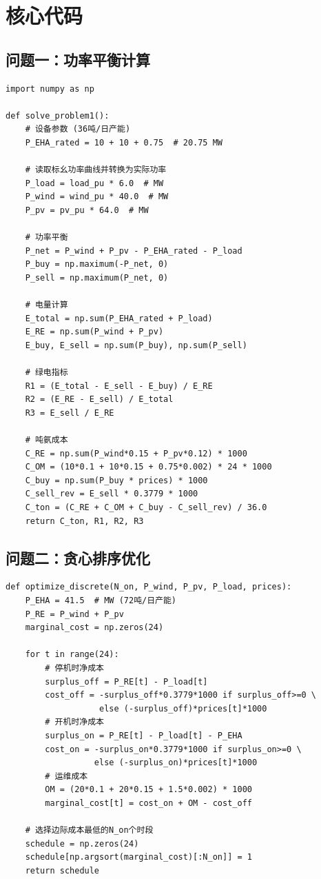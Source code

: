 \section{核心代码}

\subsection{问题一：功率平衡计算}

\begin{verbatim}
import numpy as np

def solve_problem1():
    # 设备参数 (36吨/日产能)
    P_EHA_rated = 10 + 10 + 0.75  # 20.75 MW
    
    # 读取标幺功率曲线并转换为实际功率
    P_load = load_pu * 6.0  # MW
    P_wind = wind_pu * 40.0  # MW
    P_pv = pv_pu * 64.0  # MW
    
    # 功率平衡
    P_net = P_wind + P_pv - P_EHA_rated - P_load
    P_buy = np.maximum(-P_net, 0)
    P_sell = np.maximum(P_net, 0)
    
    # 电量计算
    E_total = np.sum(P_EHA_rated + P_load)
    E_RE = np.sum(P_wind + P_pv)
    E_buy, E_sell = np.sum(P_buy), np.sum(P_sell)
    
    # 绿电指标
    R1 = (E_total - E_sell - E_buy) / E_RE
    R2 = (E_RE - E_sell) / E_total
    R3 = E_sell / E_RE
    
    # 吨氨成本
    C_RE = np.sum(P_wind*0.15 + P_pv*0.12) * 1000
    C_OM = (10*0.1 + 10*0.15 + 0.75*0.002) * 24 * 1000
    C_buy = np.sum(P_buy * prices) * 1000
    C_sell_rev = E_sell * 0.3779 * 1000
    C_ton = (C_RE + C_OM + C_buy - C_sell_rev) / 36.0
    return C_ton, R1, R2, R3
\end{verbatim}

\subsection{问题二：贪心排序优化}

\begin{verbatim}
def optimize_discrete(N_on, P_wind, P_pv, P_load, prices):
    P_EHA = 41.5  # MW (72吨/日产能)
    P_RE = P_wind + P_pv
    marginal_cost = np.zeros(24)
    
    for t in range(24):
        # 停机时净成本
        surplus_off = P_RE[t] - P_load[t]
        cost_off = -surplus_off*0.3779*1000 if surplus_off>=0 \
                   else (-surplus_off)*prices[t]*1000
        # 开机时净成本
        surplus_on = P_RE[t] - P_load[t] - P_EHA
        cost_on = -surplus_on*0.3779*1000 if surplus_on>=0 \
                  else (-surplus_on)*prices[t]*1000
        # 运维成本
        OM = (20*0.1 + 20*0.15 + 1.5*0.002) * 1000
        marginal_cost[t] = cost_on + OM - cost_off
    
    # 选择边际成本最低的N_on个时段
    schedule = np.zeros(24)
    schedule[np.argsort(marginal_cost)[:N_on]] = 1
    return schedule
\end{verbatim}

